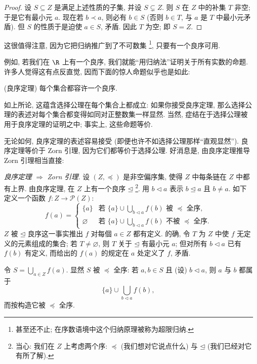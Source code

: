 \begin{proof}
设 $S\subseteq Z$ 是满足上述性质的子集, 并设 $S\subsetneq Z$. 则 $S$ 在 $Z$ 中的补集 $T$ 非空; 于是它有最小元 $a$. 现在若 $b\prec a$, 则必有 $b\in S$ (否则 $b\in T$, 与 $a$ 是 $T$ 中最小元矛盾). 但 $S$ 的性质于是迫使 $a\in S$, 矛盾. 因此 $T$ 为空; 即 $S=Z$.
\end{proof}

\noindent 这很值得注意, 因为它把归纳推广到了不可数集%
\footnote{甚至还不止; 在序数语境中这个归纳原理被称为超限归纳.}, 只要有一个良序可用.

\noindent 例如, 若我们在 $\R$ 上有一个良序, 我们就能``用归纳法''证明关于所有实数的命题. 许多人觉得这有点反直觉, 因而下面的惊人命题似乎也是如此:

\begin{theorem}\label{thm:well-ordering}
(良序定理) 每个集合都容许一个良序.
\end{theorem}

\noindent 如上所论, 这蕴含选择公理在每个集合上都成立: 如果你接受良序定理, 那么选择公理的表述对每个集合都变得如同对正整数集一样显然. 当然, 症结在于选择公理被用于良序定理的证明之中; 事实上, 这些命题等价.

\noindent 无论如何, 良序定理的表述容易接受 (即便也许不如选择公理那样``直观显然''). 良序定理等价于 Zorn 引理, 因为它们都等价于选择公理. 好消息是, 由良序定理推导 Zorn 引理相当直接:

\noindent\emph{良序定理 $\Longrightarrow$ Zorn 引理.}
设 $(Z,\preceq)$ 是非空偏序集, 使得 $Z$ 中每条链在 $Z$ 中都有上界. 由良序定理, 在 $Z$ 上有一个良序 $\unlhd$%
\footnote{当心: 我们在 $Z$ 上考虑两个序: $\preceq$ (我们想对它说点什么) 与 $\unlhd$ (我们已经对它有所了解).}. 用 $b\lhd a$ 表示 $b\unlhd a$ 且 $b\neq a$. 如下定义一个函数 $f:Z\to \mathcal{P}(Z)$:
\[
f(a)=
\begin{cases}
\{a\} & \text{若 } \{a\}\cup \bigcup_{b\lhd a} f(b) \text{ 被 } \preceq \text{ 全序},\\
\varnothing & \text{若 } \{a\}\cup \bigcup_{b\lhd a} f(b) \text{ 不被 } \preceq \text{ 全序}.
\end{cases}
\]
$Z$ 被 $\unlhd$ 良序这一事实推出 $f$ 对每個 $a\in Z$ 都有定义. 的确, 令 $T$ 为 $Z$ 中使 $f$ 无定义的元素组成的集合; 若 $T\neq\varnothing$, 则 $T$ 关于 $\unlhd$ 有最小元 $a$; 但对所有 $b\lhd a$ 已有 $f(b)$ 有定义, 而给出的 $f(a)$ 的规定在 $a$ 处定义了 $f$, 矛盾.

\noindent 令 $S=\bigcup_{a\in Z} f(a)$. 显然 $S$ 被 $\preceq$ 全序: 若 $a,b\in S$ 且 (设) $b\lhd a$, 则 $a$ 与 $b$ 都属于
\[
\{a\}\cup \bigcup_{b\lhd a} f(b),
\]
而按构造它被 $\preceq$ 全序.

